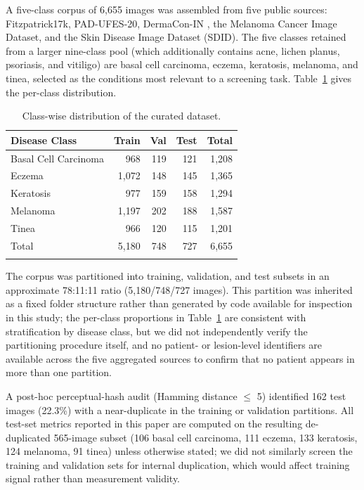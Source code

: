 \documentclass[VANCOUVER,twocolumn]{USG}
\begin{document}
A five-class corpus of 6,655 images was assembled from five public
sources: Fitzpatrick17k, PAD-UFES-20, DermaCon-IN \cite{ref5}, the Melanoma
Cancer Image Dataset, and the Skin Disease Image Dataset (SDID).
The five classes retained from a larger nine-class pool (which additionally
contains acne, lichen planus, psoriasis, and vitiligo) are basal cell
carcinoma, eczema, keratosis, melanoma, and tinea, selected as the
conditions most relevant to a screening task. Table~\ref{tab:dataset} gives
the per-class distribution.

\begin{table}[htbp]
\caption{Class-wise distribution of the curated dataset.}\label{tab:dataset}
\begin{tabular}{@{}lrrrr@{}}
\toprule
Disease Class & Train & Val & Test & Total \\
\midrule
Basal Cell Carcinoma & 968 & 119 & 121 & 1,208 \\
Eczema & 1,072 & 148 & 145 & 1,365 \\
Keratosis & 977 & 159 & 158 & 1,294 \\
Melanoma & 1,197 & 202 & 188 & 1,587 \\
Tinea & 966 & 120 & 115 & 1,201 \\
\midrule
Total & 5,180 & 748 & 727 & 6,655 \\
\botrule
\end{tabular}
\end{table}

The corpus was partitioned into training, validation, and test subsets in
an approximate 78:11:11 ratio (5,180/748/727 images). This partition was
inherited as a fixed folder structure rather than generated by code
available for inspection in this study; the per-class proportions in
Table~\ref{tab:dataset} are consistent with stratification by disease
class, but we did not independently verify the partitioning procedure
itself, and no patient- or lesion-level identifiers are available across
the five aggregated sources to confirm that no patient appears in more
than one partition.

A post-hoc perceptual-hash audit (Hamming distance $\leq$ 5) identified 162
test images (22.3\%) with a near-duplicate in the training or validation
partitions. All test-set metrics reported in this paper are computed on
the resulting de-duplicated 565-image subset (106 basal cell carcinoma,
111 eczema, 133 keratosis, 124 melanoma, 91 tinea) unless otherwise stated;
we did not similarly screen the training and validation sets for internal
duplication, which would affect training signal rather than measurement
validity.
\end{document}

